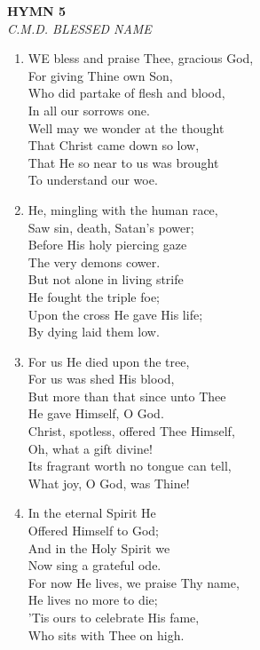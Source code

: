 \newpage
\begin{center}
    {\Large \textbf{HYMN 5}}
    \\
    \textit{C.M.D. BLESSED NAME}
\end{center}
\vspace{1em}

\begin{enumerate}
    \item WE bless and praise Thee, gracious God, \\
        For giving Thine own Son, \\
        Who did partake of flesh and blood, \\
        In all our sorrows one. \\
        Well may we wonder at the thought \\
        That Christ came down so low, \\
        That He so near to us was brought \\
        To understand our woe.

    \item He, mingling with the human race, \\
        Saw sin, death, Satan's power; \\
        Before His holy piercing gaze \\
        The very demons cower. \\
        But not alone in living strife \\
        He fought the triple foe; \\
        Upon the cross He gave His life; \\
        By dying laid them low.

    \item For us He died upon the tree, \\
        For us was shed His blood, \\
        But more than that since unto Thee \\
        He gave Himself, O God. \\
        Christ, spotless, offered Thee Himself, \\
        Oh, what a gift divine! \\
        Its fragrant worth no tongue can tell, \\
        What joy, O God, was Thine!

    \item In the eternal Spirit He \\
        Offered Himself to God; \\
        And in the Holy Spirit we \\
        Now sing a grateful ode. \\
        For now He lives, we praise Thy name, \\
        He lives no more to die; \\
        'Tis ours to celebrate His fame, \\
        Who sits with Thee on high.


\end{enumerate}
